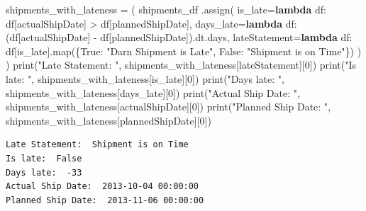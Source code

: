 \documentclass[
]{article}
\newenvironment{Shaded}{\begin{snugshade}}{\end{snugshade}}
\newcommand{\BuiltInTok}[1]{\textcolor[rgb]{0.00,0.23,0.31}{#1}}
\newcommand{\DecValTok}[1]{\textcolor[rgb]{0.68,0.00,0.00}{#1}}
\newcommand{\KeywordTok}[1]{\textcolor[rgb]{0.00,0.23,0.31}{\textbf{#1}}}
\newcommand{\NormalTok}[1]{\textcolor[rgb]{0.00,0.23,0.31}{#1}}
\newcommand{\OperatorTok}[1]{\textcolor[rgb]{0.37,0.37,0.37}{#1}}
\newcommand{\StringTok}[1]{\textcolor[rgb]{0.13,0.47,0.30}{#1}}
\newcommand{\VariableTok}[1]{\textcolor[rgb]{0.07,0.07,0.07}{#1}}
\begin{document}
\begin{Shaded}
\begin{Highlighting}[]
\NormalTok{shipments\_with\_lateness }\OperatorTok{=}\NormalTok{ (}
\NormalTok{    shipments\_df}
\NormalTok{    .assign(}
\NormalTok{        is\_late}\OperatorTok{=}\KeywordTok{lambda}\NormalTok{ df: df[}\StringTok{\textquotesingle{}actualShipDate\textquotesingle{}}\NormalTok{] }\OperatorTok{\textgreater{}}\NormalTok{ df[}\StringTok{\textquotesingle{}plannedShipDate\textquotesingle{}}\NormalTok{],}
\NormalTok{        days\_late}\OperatorTok{=}\KeywordTok{lambda}\NormalTok{ df: (df[}\StringTok{\textquotesingle{}actualShipDate\textquotesingle{}}\NormalTok{] }\OperatorTok{{-}}\NormalTok{ df[}\StringTok{\textquotesingle{}plannedShipDate\textquotesingle{}}\NormalTok{]).dt.days,}
\NormalTok{        lateStatement}\OperatorTok{=}\KeywordTok{lambda}\NormalTok{ df: df[}\StringTok{\textquotesingle{}is\_late\textquotesingle{}}\NormalTok{].}\BuiltInTok{map}\NormalTok{(\{}\VariableTok{True}\NormalTok{: }\StringTok{"Darn Shipment is Late"}\NormalTok{, }\VariableTok{False}\NormalTok{: }\StringTok{"Shipment is on Time"}\NormalTok{\})}
\NormalTok{    )}
\NormalTok{)}
\BuiltInTok{print}\NormalTok{(}\StringTok{"Late Statement: "}\NormalTok{, shipments\_with\_lateness[}\StringTok{\textquotesingle{}lateStatement\textquotesingle{}}\NormalTok{][}\DecValTok{0}\NormalTok{])}
\BuiltInTok{print}\NormalTok{(}\StringTok{"Is late: "}\NormalTok{, shipments\_with\_lateness[}\StringTok{\textquotesingle{}is\_late\textquotesingle{}}\NormalTok{][}\DecValTok{0}\NormalTok{])}
\BuiltInTok{print}\NormalTok{(}\StringTok{"Days late: "}\NormalTok{, shipments\_with\_lateness[}\StringTok{\textquotesingle{}days\_late\textquotesingle{}}\NormalTok{][}\DecValTok{0}\NormalTok{])}
\BuiltInTok{print}\NormalTok{(}\StringTok{"Actual Ship Date: "}\NormalTok{, shipments\_with\_lateness[}\StringTok{\textquotesingle{}actualShipDate\textquotesingle{}}\NormalTok{][}\DecValTok{0}\NormalTok{])}
\BuiltInTok{print}\NormalTok{(}\StringTok{"Planned Ship Date: "}\NormalTok{, shipments\_with\_lateness[}\StringTok{\textquotesingle{}plannedShipDate\textquotesingle{}}\NormalTok{][}\DecValTok{0}\NormalTok{])}
\end{Highlighting}
\end{Shaded}

\begin{verbatim}
Late Statement:  Shipment is on Time
Is late:  False
Days late:  -33
Actual Ship Date:  2013-10-04 00:00:00
Planned Ship Date:  2013-11-06 00:00:00
\end{verbatim}
\end{document}
